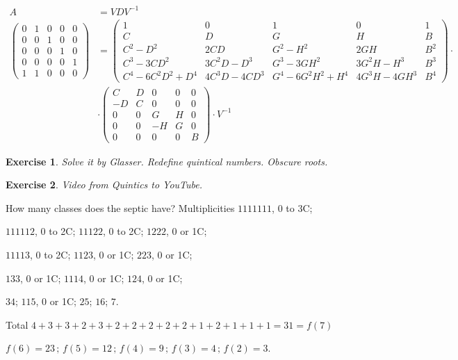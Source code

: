 \documentclass[12pt,a4paper]{article}
\newtheorem{exercise}{Exercise}[section]
\begin{document}
\begin{align}
A &= VDV^{-1} \\
\left( \begin{matrix} 0&1&0&0&0 \\ 0&0&1&0&0 \\ 0&0&0&1&0 \\ 0&0&0&0&1 \\ 1 & 1&0&0&0 \end{matrix} \right)
&=
\left( \begin{matrix} 1 & 0 & 1 & 0 & 1 \\ C & D & G & H & B \\ C^2-D^2 & 2CD & G^2-H^2 & 2GH & B^2 \\ C^3-3CD^2 & 3C^2D - D^3 & G^3-3GH^2 & 3G^2H - H^3 & B^3 \\ C^4-6C^2D^2+D^4&4C^3D-4CD^3   &  G^4-6G^2H^2+H^4&4G^3H-4GH^3    & B^4  \end{matrix} \right) \cdot \nonumber \\
&\cdot \left( \begin{matrix} C & D&0&0&0 \\ -D & C&0&0&0 \\ 0 & 0 & G & H & 0 \\ 0 & 0 & -H & G & 0 \\ 0 & 0 & 0 & 0 & B \end{matrix} \right) \cdot V^{-1}
\end{align}

\begin{exercise}
Solve it by Glasser. Redefine quintical numbers. Obscure roots.
\end{exercise}

\begin{exercise}
Video from Quintics to YouTube.
\end{exercise}

\vspace{3mm}

How many classes does the septic have? Multiplicities $1111111$, 0 to 3C;

$111112$, 0 to 2C; $11122$, 0 to 2C; $1222$, 0 or 1C;

$11113$, 0 to 2C; $1123$, 0 or 1C; $223$, 0 or 1C;

$133$, 0 or 1C; $1114$, 0 or 1C; $124$, 0 or 1C;

$34$; $115$, 0 or 1C; $25$; $16$; $7$.

Total $4+3+3+2+3+2+2+2+2+2+1+2+1+1+1 = 31 = f(7)$

$f(6) = 23\,;\,f(5) = 12\,;\,f(4) = 9\,;\,f(3) = 4\,;\,f(2) = 3$.
\end{document}
